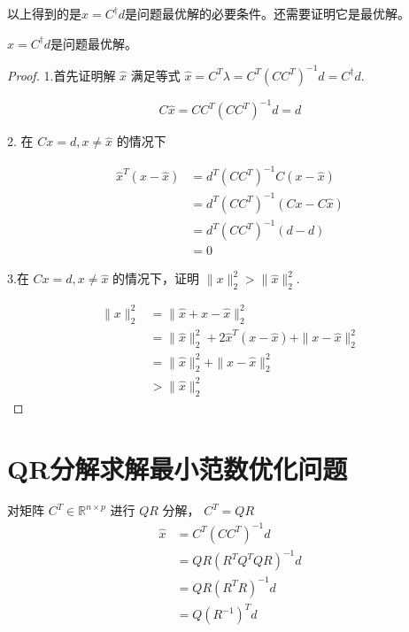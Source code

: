 以上得到的是$\hat{x}=C^{\dagger} d$是问题最优解的必要条件。还需要证明它是最优解。

\begin{theorem}
    $\hat{x}=C^{\dagger} d$是问题最优解。
\end{theorem}

\begin{proof}
    1.首先证明解 $ \hat{x} $ 满足等式 $ \hat{x}=C^{T} \lambda=C^{T}\left(C C^{T}\right)^{-1} d=C^{\dagger} d $.

\begin{equation}
C \hat{x}=C C^{T}\left(C C^{T}\right)^{-1} d=d
\end{equation}

2. 在 $ C x=d, x \neq \hat{x} $ 的情况下

\begin{equation}
\begin{aligned}
\hat{x}^{T}(x-\hat{x}) &=d^{T}\left(C C^{T}\right)^{-1} C(x-\hat{x}) \\
&=d^{T}\left(C C^{T}\right)^{-1}(C x-C \hat{x}) \\
&=d^{T}\left(C C^{T}\right)^{-1}(d-d) \\
&=0
\end{aligned}
\end{equation}

3.在 $ C x=d, x \neq \hat{x} $ 的情况下，证明 $ \|x\|_{2}^{2}>\|\hat{x}\|_{2}^{2} $.

\begin{equation}
\begin{aligned}
\|x\|_{2}^{2} &=\|\hat{x}+x-\hat{x}\|_{2}^{2} \\
&=\|\hat{x}\|_{2}^{2}+2 \hat{x}^{T}(x-\hat{x})+\|x-\hat{x}\|_{2}^{2} \\
&=\|\hat{x}\|_{2}^{2}+\|x-\hat{x}\|_{2}^{2} \\
&>\|\hat{x}\|_{2}^{2}
\end{aligned}
\end{equation}
\end{proof}

\section{QR分解求解最小范数优化问题}

对矩阵 $ C^{T} \in \mathbb{R}^{n \times p} $ 进行 $ Q R $ 分解， $ C^{T}=Q R $
\begin{equation}
\begin{aligned}
\hat{x} &=C^{T}\left(C C^{T}\right)^{-1} d \\
&=Q R\left(R^{T} Q^{T} Q R\right)^{-1} d \\
&=Q R\left(R^{T} R\right)^{-1} d \\
&=Q \left(R^{-1}\right)^T d
\end{aligned}
\end{equation}

